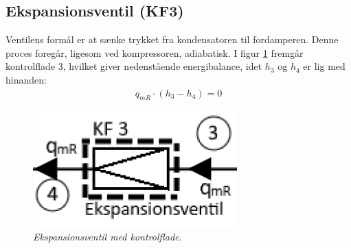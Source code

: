 \documentclass[../Hovedrapport.tex]{subfiles}
\begin{document}
\subsection{Ekspansionsventil (KF3)}
\begin{minipage}[t]{0.5\textwidth}
Ventilens formål er at sænke trykket fra kondensatoren til fordamperen. Denne proces foregår, ligesom ved kompressoren, adiabatisk. 
I figur \ref{fig:Ekspansionsventil-KF} fremgår kontrolflade 3, hvilket giver nedenstående energibalance, idet $h_3$ og $h_4$ er lig med hinanden:
\begin{align}
    q_{mR} \cdot(h_{3}-h_{4})=0  
\end{align}
\end{minipage}
\begin{minipage}[t]{0.5\textwidth}
\vspace{-40pt}
\begin{figure}[H] %
	\centering
	\includegraphics[width=0.7\textwidth]{Billeder/KF_3.png}
	\caption{\textit{Ekspansionsventil med kontrolflade}.}
	\label{fig:Ekspansionsventil-KF}
\end{figure}
\end{minipage}
\end{document}

